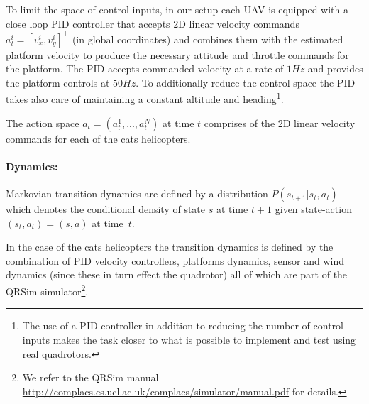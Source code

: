 \documentclass[a4paper,11pt]{report}
\newcommand{\sname}{QRSim\xspace}
\newcommand{\webman}{\url{http://complacs.cs.ucl.ac.uk/complacs/simulator/manual.pdf}\xspace}
\begin{document}
To limit the space of control inputs, in our setup each UAV is equipped with a close loop PID controller that accepts 2D linear velocity commands $a^i_t=[v^i_x,v^i_y]^\intercal$ (in global coordinates) and combines them with the estimated platform velocity to produce the necessary attitude and throttle commands for the platform. The PID accepts commanded velocity at a rate of $1Hz$ and provides the platform controls at $50Hz$.
To additionally reduce the control space the PID takes also care of maintaining a constant altitude and heading\footnote{The use of a PID controller in addition to reducing the number of control inputs makes the task closer to what is possible to implement and test using real quadrotors.}. 

The action space $a_t = (a^1_t,...,a^{N}_t)$ at time $t$ comprises of the 2D linear velocity commands for each of the cats helicopters. 

\paragraph{Dynamics:} 
Markovian transition dynamics are defined by a distribution $P(s_{t+1}|s_t,a_t)$ which denotes the conditional density of state $s$ at time $t+1$ given state-action $(s_t,a_t)=(s,a)$ at time~$t$.

In the case of the cats helicopters the transition dynamics is defined by the combination of PID velocity controllers, platforms dynamics, sensor and wind dynamics (since these in turn effect the quadrotor) all of which are part of the \sname simulator\footnote{We refer to the \sname manual \webman for details.}. 
\end{document}
